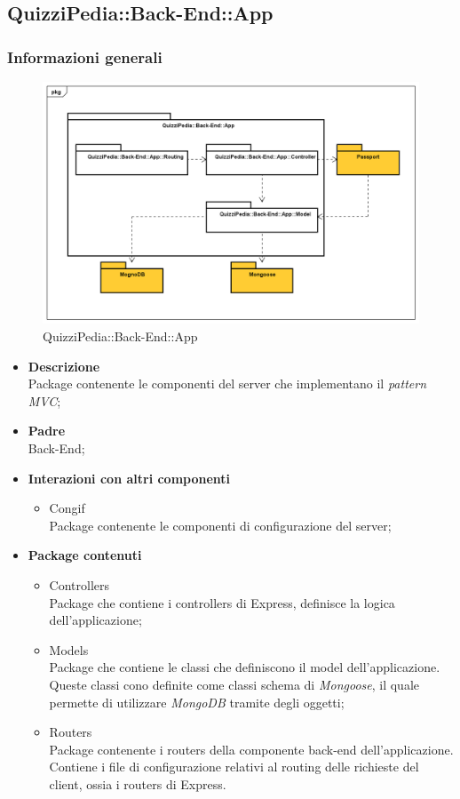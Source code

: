 \subsection{QuizziPedia::Back-End::App}
\subsubsection{Informazioni generali}
\label{QuizziPedia::Back-End::App}
\begin{figure}
	\centering
	\includegraphics[scale=0.45]{UML/Package/QuizziPedia_Back-End_App.png}
	\caption{QuizziPedia::Back-End::App}
\end{figure}
	\begin{itemize}
		\item \textbf{Descrizione} \\
		Package contenente le componenti del server che implementano il \textit{pattern\ped{G} MVC};
		\item \textbf{Padre} \\ Back-End;
		\item \textbf{Interazioni con altri componenti}
			\begin{itemize}
				\item Congif \\
				Package contenente le componenti di configurazione del server;
			\end{itemize}
		\item \textbf{Package contenuti}
			\begin{itemize}
				\item Controllers \\
				Package che contiene i controllers di Express, definisce la logica dell'applicazione;
				\item Models \\
				Package che contiene le classi che definiscono il model dell'applicazione. Queste classi cono definite come classi schema di \textit{Mongoose}, il quale permette di utilizzare \textit{MongoDB} tramite degli oggetti;
				\item Routers \\
				Package contenente i routers della componente back-end dell'applicazione. Contiene i file di configurazione relativi al routing delle richieste del client, ossia i routers di Express.
			\end{itemize}
	\end{itemize}
	

